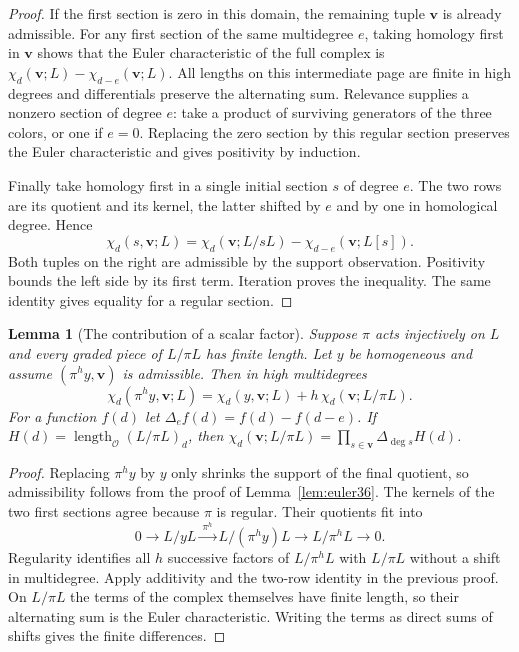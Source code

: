 \documentclass[a4paper,11pt]{article}
\newtheorem{lemma}[proposition]{Lemma}
\theoremstyle{definition}
\theoremstyle{remark}
\newcommand{\len}{\operatorname{length}}\newcommand{\Res}{\operatorname*{Res}}
\numberwithin{equation}{section}
\newcommand{\OO}{\mathcal O}
\begin{document}
\begin{proof}
If the first section is zero in this domain, the remaining tuple \(\mathbf v\) is already admissible. For any first section of the same multidegree \(e\), taking homology first in \(\mathbf v\) shows that the Euler characteristic of the full complex is
\(\chi_d(\mathbf v;L)-\chi_{d-e}(\mathbf v;L)\). All lengths on this intermediate page are finite in high degrees and differentials preserve the alternating sum. Relevance supplies a nonzero section of degree \(e\): take a product of surviving generators of the three colors, or one if \(e=0\). Replacing the zero section by this regular section preserves the Euler characteristic and gives positivity by induction.

Finally take homology first in a single initial section \(s\) of degree \(e\). The two rows are its quotient and its kernel, the latter shifted by \(e\) and by one in homological degree. Hence
\[
 \chi_d(s,\mathbf v;L)=\chi_d(\mathbf v;L/sL)
                      -\chi_{d-e}(\mathbf v;L[s]).
\]
Both tuples on the right are admissible by the support observation. Positivity bounds the left side by its first term. Iteration proves the inequality. The same identity gives equality for a regular section.
\end{proof}

\begin{lemma}[The contribution of a scalar factor]\label{lem:peel36}
Suppose \(\pi\) acts injectively on \(L\) and every graded piece of \(L/\pi L\) has finite length. Let \(y\) be homogeneous and assume \((\pi^h y,\mathbf v)\) is admissible. Then in high multidegrees
\[
  \chi_d(\pi^h y,\mathbf v;L)=\chi_d(y,\mathbf v;L)
                                    +h\,\chi_d(\mathbf v;L/\pi L).
\]
For a function \(f(d)\) let \(\Delta_e f(d)=f(d)-f(d-e)\). If \(H(d)=\len_{\OO}(L/\pi L)_d\), then \(\chi_d(\mathbf v;L/\pi L)=\prod_{s\in\mathbf v}\Delta_{\deg s}H(d)\).
\end{lemma}
\begin{proof}
Replacing \(\pi^h y\) by \(y\) only shrinks the support of the final quotient, so admissibility follows from the proof of Lemma~\ref{lem:euler36}. The kernels of the two first sections agree because \(\pi\) is regular. Their quotients fit into
\[
 0\longrightarrow L/yL\xrightarrow{\ \pi^h\ }L/(\pi^hy)L
                                     \longrightarrow L/\pi^h L\longrightarrow0 .
\]
Regularity identifies all \(h\) successive factors of \(L/\pi^hL\) with \(L/\pi L\) without a shift in multidegree. Apply additivity and the two-row identity in the previous proof. On \(L/\pi L\) the terms of the complex themselves have finite length, so their alternating sum is the Euler characteristic. Writing the terms as direct sums of shifts gives the finite differences.
\end{proof}
\end{document}
